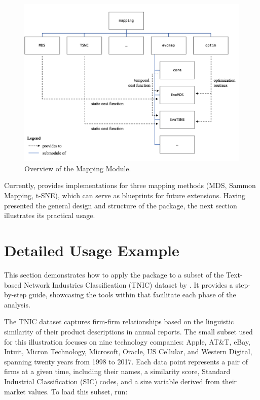 \documentclass[article]{jss}
\begin{document}
\begin{figure}[hbt!]
  \centering
  \includegraphics{../misc/package-design.png}
  \caption{\label{fig:package-design} Overview of the Mapping Module.}
\end{figure}
  
Currently,  provides implementations for three mapping methods (MDS, Sammon
Mapping, t-SNE), which can serve as blueprints for future extensions. Having presented the
general design and structure of the package, the next section illustrates its practical usage. 


\section{Detailed Usage Example} \label{sec:usage-example}

This section demonstrates how to apply the  package to a subset 
of the Text-based Network Industries Classification (TNIC) dataset by \cite{Hoberg+Phillips:2016}. 
It provides a step-by-step guide, showcasing the tools within  that facilitate 
each phase of the analysis. 

The TNIC dataset captures firm-firm relationships based on the linguistic similarity of their product descriptions 
in annual reports. The small subset used for this illustration focuses on nine technology companies: 
Apple, AT\&T, eBay, Intuit, Micron Technology, Microsoft, Oracle, US Cellular, and Western Digital, 
spanning twenty years from 1998 to 2017. Each data point represents a pair of firms at a given time, 
including their names, a similarity score, Standard Industrial Classification (SIC) codes, 
and a size variable derived from their market values. To load this subset, run:
\end{document}
